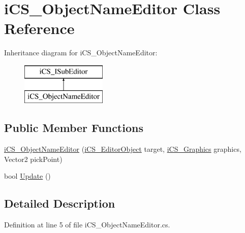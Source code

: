 \hypertarget{classi_c_s___object_name_editor}{\section{i\+C\+S\+\_\+\+Object\+Name\+Editor Class Reference}
\label{classi_c_s___object_name_editor}
}
Inheritance diagram for i\+C\+S\+\_\+\+Object\+Name\+Editor\+:\begin{figure}[H]
\begin{center}
\leavevmode
\includegraphics[height=2.000000cm]{classi_c_s___object_name_editor}
\end{center}
\end{figure}
\subsection*{Public Member Functions}
\begin{DoxyCompactItemize}
\item 
\hyperlink{classi_c_s___object_name_editor_a74935746587096cdf8ba0dae31aa1062}{i\+C\+S\+\_\+\+Object\+Name\+Editor} (\hyperlink{classi_c_s___editor_object}{i\+C\+S\+\_\+\+Editor\+Object} target, \hyperlink{classi_c_s___graphics}{i\+C\+S\+\_\+\+Graphics} graphics, Vector2 pick\+Point)
\item 
bool \hyperlink{classi_c_s___object_name_editor_a21d8f03208645383da5219451327c737}{Update} ()
\end{DoxyCompactItemize}


\subsection{Detailed Description}


Definition at line 5 of file i\+C\+S\+\_\+\+Object\+Name\+Editor.\+cs.




